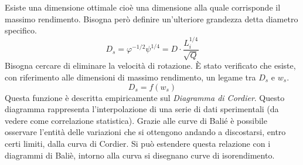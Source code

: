 Esiste una dimensione ottimale cioè una dimensione alla quale corrisponde il massimo rendimento. Bisogna però definire un’ulteriore grandezza detta diametro specifico.
\begin{equation}
D_s= \varphi^{-1/2} \psi^{1/4} = D \cdot \frac{L_i^{1/4}}{\sqrt{Q}}
\end{equation}
Bisogna cercare di eliminare la velocità di rotazione. È stato verificato che esiste, con riferimento alle dimensioni di massimo rendimento, un legame tra $D_s$ e $w_s$. 
\begin{equation}
D_s=f(w_s)
\end{equation}
Questa funzione è descritta empiricamente sul \textit{Diagramma di Cordier}. Questo diagramma rappresenta l’interpolazione di una serie di dati sperimentali (da vedere come correlazione statistica).
Grazie alle curve di Balié è possibile osservare l’entità delle variazioni che si ottengono andando a discostarsi, entro certi limiti, dalla curva di Cordier.
Si può estendere questa relazione con i diagrammi di Baliè, intorno alla curva si disegnano curve di isorendimento.
